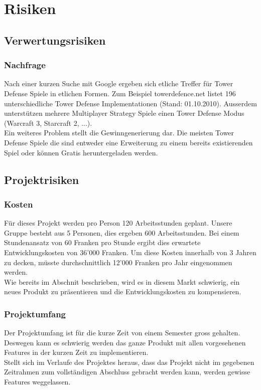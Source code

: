 \section{Risiken} \label{sec:Risiken}
\subsection{Verwertungsrisiken}
\subsubsection{Nachfrage} \label{subsec:Risiken-Nachfrage}
Nach einer kurzen Suche mit Google ergeben sich etliche Treffer für Tower Defense Spiele in etlichen Formen. Zum Beispiel towerdefence.net listet 196 unterschiedliche Tower Defense Implementationen (Stand: 01.10.2010). Ausserdem unterstützen mehrere Multiplayer Strategy Spiele einen Tower Defense Modus (Warcraft 3, Starcraft 2, ...). \\
Ein weiteres Problem stellt die Gewinngenerierung dar. Die meisten Tower Defense Spiele die sind entweder eine Erweiterung zu einem bereits existierenden Spiel oder können Gratis heruntergeladen werden.

\subsection{Projektrisiken}
\subsubsection{Kosten} \label{subsec:Risiken-Kosten}
Für dieses Projekt werden pro Person 120 Arbeitsstunden geplant. Unsere Gruppe besteht aus 5 Personen, dies ergeben 600 Arbeitsstunden. Bei einem Stundenansatz von 60 Franken pro Stunde ergibt dies erwartete Entwicklungskosten von 36'000 Franken. Um diese Kosten innerhalb von 3 Jahren zu decken, müsste durchschnittlich 12'000 Franken pro Jahr eingenommen werden. \\
Wie bereits im Abschnit  beschrieben, wird es in diesem Markt schwierig, ein neues Produkt zu präsentieren und die Entwicklungskosten zu kompensieren.

\subsubsection{Projektumfang} \label{subsec:Risiken-Projektumfang}
Der Projektumfang ist für die kurze Zeit von einem Semester gross gehalten. Deswegen kann es schwierig werden das ganze Produkt mit allen vorgesehenen Features in der kurzen Zeit zu implementieren. \\
Stellt sich im Verlaufe des Projektes heraus, dass das Projekt nicht im gegebenen Zeitrahmen zum vollständigen Abschluss gebracht werden kann, werden gewisse Features weggelassen.

